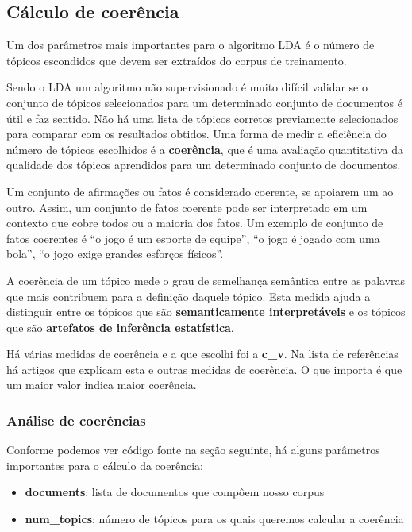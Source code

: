 \subsection{Cálculo de coerência}

Um dos parâmetros mais importantes para o algoritmo LDA é o número de tópicos escondidos que devem ser extraídos do corpus de treinamento.

Sendo o LDA um algoritmo não supervisionado é muito difícil validar se o conjunto de tópicos selecionados para um determinado conjunto de documentos
é útil e faz sentido. Não há uma lista de tópicos corretos previamente selecionados para comparar com os resultados obtidos. Uma forma de medir a 
eficiência do número de tópicos escolhidos é a \textbf{coerência}, que é uma avaliação quantitativa da qualidade dos tópicos aprendidos para um determinado 
conjunto de documentos.

Um conjunto de afirmações ou fatos é considerado coerente, se apoiarem um ao outro. Assim, um conjunto de fatos coerente pode ser interpretado 
em um contexto que cobre todos ou a maioria dos fatos. Um exemplo de conjunto de fatos coerentes é “o jogo é um esporte de equipe”, 
“o jogo é jogado com uma bola”, “o jogo exige grandes esforços físicos”.

A coerência de um tópico mede o grau de semelhança semântica entre as palavras que mais contribuem para a definição daquele tópico.
Esta medida ajuda a distinguir entre os tópicos que são \textbf{semanticamente interpretáveis} e os tópicos que são 
\textbf{artefatos de inferência estatística}.

Há várias medidas de coerência e a que escolhi foi a \textbf{c\_v}. Na lista de referências há artigos que explicam esta e outras 
medidas de coerência. O que importa é que um maior valor indica maior coerência.

\subsubsection{Análise de coerências}

Conforme podemos ver código fonte na seção seguinte, há alguns parâmetros importantes para o cálculo da coerência:

\begin{itemize}
    \item \textbf{documents}: lista de documentos que compôem nosso corpus
    \item \textbf{num\_topics}: número de tópicos para os quais queremos calcular a coerência
\end{itemize}

